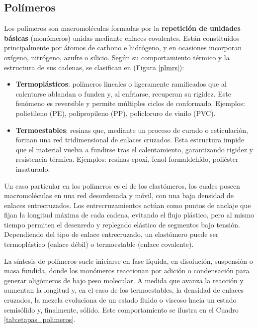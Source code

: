 \subsection{Polímeros}

Los polímeros son macromoléculas formadas por la \textbf{repetición de unidades básicas} (monómeros) unidas mediante enlaces covalentes. Están constituidos principalmente por átomos de carbono e hidrógeno, y en ocasiones incorporan oxígeno, nitrógeno, azufre o silicio. Según su comportamiento térmico y la estructura de sus cadenas, se clasifican en (Figura \ref{plmrs}):

\begin{itemize}
  \item \textbf{Termoplásticos}: polímeros lineales o ligeramente ramificados que al calentarse ablandan o funden y, al enfriarse, recuperan su rigidez. Este fenómeno es reversible y permite múltiples ciclos de conformado. Ejemplos: polietileno (PE), polipropileno (PP), policloruro de vinilo (PVC).
  \item \textbf{Termoestables}: resinas que, mediante un proceso de curado o reticulación, forman una red tridimensional de enlaces cruzados. Esta estructura impide que el material vuelva a fundirse tras el calentamiento, garantizando rigidez y resistencia térmica. Ejemplos: resinas epoxi, fenol-formaldehído, poliéster insaturado.
\end{itemize}

Un caso particular en los polímeros es el de los elastómeros, los cuales poseen macromoléculas en una red desordenada y móvil, con una baja densidad de enlaces entrecruzados. Los entrecruzamientos actúan como puntos de anclaje que fijan la longitud máxima de cada cadena, evitando el flujo plástico, pero al mismo tiempo permiten el desenredo y replegado elástico de segmentos bajo tensión. Dependiendo del tipo de enlace entrecruzado, un elastómero puede ser termoplástico (enlace débil) o termoestable (enlace covalente).

La síntesis de polímeros suele iniciarse en fase líquida, en disolución, suspensión o masa fundida, donde los monómeros reaccionan por adición o condensación para generar oligómeros de bajo peso molecular. A medida que avanza la reacción y aumentan la longitud y, en el caso de los termoestables, la densidad de enlaces cruzados, la mezcla evoluciona de un estado fluido o viscoso hacia un estado semisólido y, finalmente, sólido. Este comportamiento se ilustra en el Cuadro \ref{tab:etapas_polimeros}.

